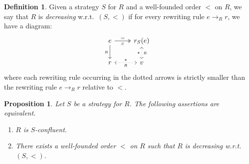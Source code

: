 \documentclass[10pt]{easychair}
\newtheorem{proposition}[theorem]{Proposition}
\theoremstyle{definition}
\newtheorem{definition}[theorem]{Definition}
\newcommand\rewR{\to_R}
\begin{document}
\begin{definition}\label{def:decreasing}
  Given a strategy $S$ for $R$ and a well-founded order $<$ on $R$,
  we say that $R$ is {\em decreasing} w.r.t.\ $(S,<)$ if for every
  rewriting rule $e\rewR r$, we have a diagram:
  \[\begin{tikzcd}
      e\ar[d, "_R"']\ar[r, twoheadrightarrow, "=", "_S"'] &
      r_S(e)\ar[d, leftrightarrow, dotted, "*"', "_R"]\\
      r\ar[r, leftrightarrow, dotted, "*", "_R"'] & v
    \end{tikzcd}\]
  where each rewriting rule occurring in the dotted arrows is strictly
  smaller than the rewriting rule $e\rewR r$ relative to $<$.
\end{definition}
\smallskip

\begin{proposition}\label{prop:S-conf_decreasing}
  Let $S$ be a strategy for $R$. The following assertions are equivalent.
  \begin{enumerate}
  \item $R$ is $S$-confluent.
  \item There exists a well-founded order $<$ on $R$ such that $R$ is
    decreasing w.r.t.\ $(S,<)$.
  \end{enumerate}
\end{proposition}
\end{document}
